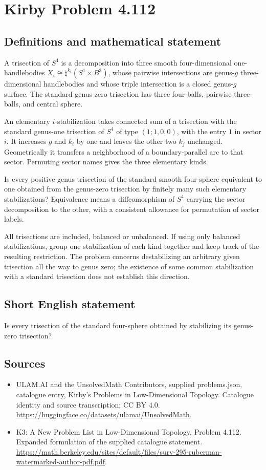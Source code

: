 \documentclass[11pt,a4paper]{article}
\begin{document}
\section*{Kirby Problem 4.112}\label{statement}

\subsection{Definitions and mathematical statement}
A trisection of $S^4$ is a decomposition into three smooth four-dimensional one-handlebodies $X_i\cong\natural^{k_i}(S^1\times B^3)$, whose pairwise intersections are genus-$g$ three-dimensional handlebodies and whose triple intersection is a closed genus-$g$ surface. The standard genus-zero trisection has three four-balls, pairwise three-balls, and central sphere.

An elementary $i$-stabilization takes connected sum of a trisection with the standard genus-one trisection of $S^4$ of type $(1;1,0,0)$, with the entry $1$ in sector $i$. It increases $g$ and $k_i$ by one and leaves the other two $k_j$ unchanged. Geometrically it transfers a neighborhood of a boundary-parallel arc to that sector. Permuting sector names gives the three elementary kinds.

Is every positive-genus trisection of the standard smooth four-sphere equivalent to one obtained from the genus-zero trisection by finitely many such elementary stabilizations? Equivalence means a diffeomorphism of $S^4$ carrying the sector decomposition to the other, with a consistent allowance for permutation of sector labels.

All trisections are included, balanced or unbalanced. If using only balanced stabilizations, group one stabilization of each kind together and keep track of the resulting restriction. The problem concerns destabilizing an arbitrary given trisection all the way to genus zero; the existence of some common stabilization with a standard trisection does not establish this direction.
\subsection{Short English statement}
Is every trisection of the standard four-sphere obtained by stabilizing its genus-zero trisection?
\subsection{Sources}
\begin{itemize}
\item[S1] ULAM.AI and the UnsolvedMath Contributors, supplied problems.json, catalogue entry, Kirby's Problems in Low-Dimensional Topology. Catalogue identity and source transcription; CC BY 4.0.
\url{https://huggingface.co/datasets/ulamai/UnsolvedMath}.
\item[S2] K3: A New Problem List in Low-Dimensional Topology, Problem 4.112. Expanded formulation of the supplied catalogue statement.
\url{https://math.berkeley.edu/sites/default/files/surv-295-ruberman-watermarked-author-pdf.pdf}.
\end{itemize}
\end{document}
